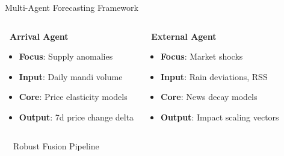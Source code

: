 \documentclass{beamer}
\begin{document}
\begin{frame}{Multi-Agent Forecasting Framework}
\begin{columns}[T]
    \begin{smallcard}[0.98\textwidth, top=2pt, bottom=2.5pt, left=4pt, right=4pt, boxsep=0.5pt]
        \centering
        \textbf{\textcolor{primaryDark}{\fontsize{6.5pt}{7.5pt}\selectfont {}~Arrival Agent}}
        \vspace{0.05cm}
        \begin{itemize}\setlength\itemsep{0.5pt}\setlength\parskip{0pt}
            \tiny
            \item \textbf{Focus}: Supply anomalies
            \item \textbf{Input}: Daily mandi volume
            \item \textbf{Core}: Price elasticity models
            \item \textbf{Output}: 7d price change delta
        \end{itemize}
    \end{smallcard}

    \begin{smallcard}[0.98\textwidth, top=2pt, bottom=2.5pt, left=4pt, right=4pt, boxsep=0.5pt]
        \centering
        \textbf{\textcolor{accentTeal}{\fontsize{6.5pt}{7.5pt}\selectfont {}~External Agent}}
        \vspace{0.05cm}
        \begin{itemize}\setlength\itemsep{0.5pt}\setlength\parskip{0pt}
            \tiny
            \item \textbf{Focus}: Market shocks
            \item \textbf{Input}: Rain deviations, RSS
            \item \textbf{Core}: News decay models
            \item \textbf{Output}: Impact scaling vectors
        \end{itemize}
    \end{smallcard}
\end{columns}

\vspace{-0.02cm}
{\centering\textcolor{primaryLight}{\fontsize{5pt}{6pt}\selectfont {}~~Robust Fusion Pipeline~~}\par}
\vspace{-0.02cm}


\end{frame}
\end{document}
